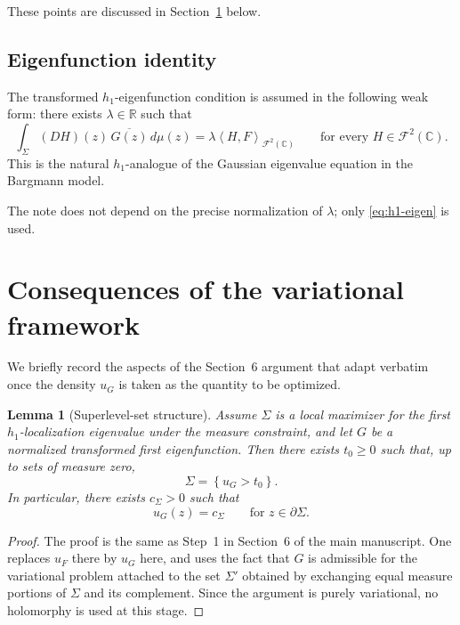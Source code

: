 \documentclass[11pt]{article}
\newtheorem{lemma}[theorem]{Lemma}
\newcommand{\C}{\mathbb C}
\newcommand{\R}{\mathbb R}
\newcommand{\F}{\mathcal F^2(\C)}
\newcommand{\dmu}{\,d\mu}
\newcommand{\1}{\mathbf 1}
\newcommand{\inner}[2]{\left\langle #1,#2\right\rangle}
\newcommand{\set}[1]{\left\{#1\right\}}
\begin{document}
These points are discussed in Section~\ref{sec:variational-consequences} below.

\subsection{Eigenfunction identity}

The transformed \(h_1\)-eigenfunction condition is assumed in the following weak
form: there exists \(\lambda\in\R\) such that
\begin{equation}\label{eq:h1-eigen}
\int_\Sigma (D H)(z)\,\overline{G(z)}\dmu(z)
=
\lambda \inner{H}{F}_{\F}
\qquad
\text{for every }H\in \F.
\end{equation}
This is the natural \(h_1\)-analogue of the Gaussian eigenvalue equation in the
Bargmann model.

The note does not depend on the precise normalization of \(\lambda\); only
\eqref{eq:h1-eigen} is used.

\section{Consequences of the variational framework}\label{sec:variational-consequences}

We briefly record the aspects of the Section~6 argument that adapt verbatim once the
density \(u_G\) is taken as the quantity to be optimized.

\begin{lemma}[Superlevel-set structure]\label{lem:superlevel}
Assume \(\Sigma\) is a local maximizer for the first \(h_1\)-localization eigenvalue
under the measure constraint, and let \(G\) be a normalized transformed first
eigenfunction. Then there exists \(t_0\ge 0\) such that, up to sets of measure zero,
\[
\Sigma=\set{u_G>t_0}.
\]
In particular, there exists \(c_\Sigma>0\) such that
\begin{equation}\label{eq:boundary-level}
u_G(z)=c_\Sigma
\qquad
\text{for }z\in\partial\Sigma.
\end{equation}
\end{lemma}

\begin{proof}
The proof is the same as Step~1 in Section~6 of the main manuscript. One replaces
\(u_F\) there by \(u_G\) here, and uses the fact that \(G\) is admissible for the
variational problem attached to the set \(\Sigma'\) obtained by exchanging equal
measure portions of \(\Sigma\) and its complement. Since the argument is purely
variational, no holomorphy is used at this stage.
\end{proof}
\end{document}
